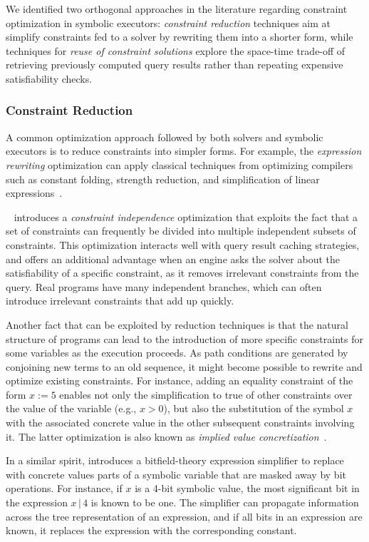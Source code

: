 We identified two orthogonal approaches in the literature regarding constraint optimization in symbolic executors: {\em constraint reduction} techniques aim at simplify constraints fed to a solver by rewriting them into a shorter form, while techniques for {\em reuse of constraint solutions} explore the space-time trade-off of retrieving previously computed query results rather than repeating expensive satisfiability checks.

\subsubsection{Constraint Reduction}
A common optimization approach followed by both solvers and symbolic executors is to reduce constraints into simpler forms. For example, the {\em expression rewriting} optimization can apply classical techniques from optimizing compilers such as constant folding, strength reduction, and simplification of linear expressions~\cite{KLEE-OSDI08}.

~\cite{EXE-CCS06} introduces a {\em constraint independence} optimization that exploits the fact that a set of constraints can frequently be divided into multiple independent subsets of constraints. This optimization interacts well with query result caching strategies, and offers an additional advantage when an engine asks the solver about the satisfiability of a specific constraint, as it removes irrelevant constraints from the query. Real programs have many independent branches, which can often introduce irrelevant constraints that add up quickly.

Another fact that can be exploited by reduction techniques is that the natural structure of programs can lead to the introduction of more specific constraints for some variables as the execution proceeds. As path conditions are generated by conjoining new terms to an old sequence, it might become possible to rewrite and optimize existing constraints. For instance, adding an equality constraint of the form $x:=5$ enables not only the simplification to true of other constraints over the value of the variable (e.g., $x>0$), but also the substitution of the symbol $x$ with the associated concrete value in the other subsequent constraints involving it. The latter optimization is also known as {\em implied value concretization}~\cite{KLEE-OSDI08}.

In a similar spirit, \cite{CKC-TOCS12} introduces a bitfield-theory expression simplifier to replace with concrete values parts of a symbolic variable that are masked away by bit operations. For instance, if $x$ is a 4-bit symbolic value, the most significant bit in the expression $x\,|\,4$ is known to be one. The simplifier can propagate information across the tree representation of an expression, and if all bits in an expression are known, it replaces the expression with the corresponding constant.
 
